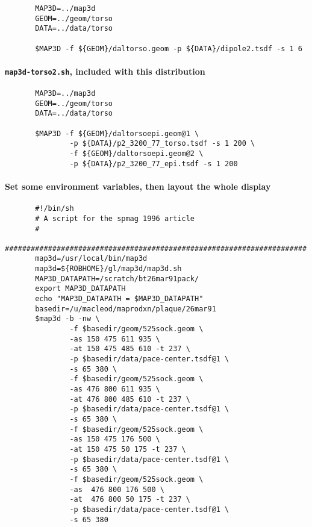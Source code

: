 \begin{verbatim}
       MAP3D=../map3d
       GEOM=../geom/torso
       DATA=../data/torso

       $MAP3D -f ${GEOM}/daltorso.geom -p ${DATA}/dipole2.tsdf -s 1 6
\end{verbatim}

\paragraph{\texttt{map3d-torso2.sh}, included with this distribution}

\begin{verbatim}
       MAP3D=../map3d
       GEOM=../geom/torso
       DATA=../data/torso

       $MAP3D -f ${GEOM}/daltorsoepi.geom@1 \
               -p ${DATA}/p2_3200_77_torso.tsdf -s 1 200 \
               -f ${GEOM}/daltorsoepi.geom@2 \
               -p ${DATA}/p2_3200_77_epi.tsdf -s 1 200

\end{verbatim}


\paragraph{Set some environment variables, then layout the whole display}

\begin{verbatim}
       #!/bin/sh
       # A script for the spmag 1996 article
       #
       ######################################################################
       map3d=/usr/local/bin/map3d
       map3d=${ROBHOME}/gl/map3d/map3d.sh
       MAP3D_DATAPATH=/scratch/bt26mar91pack/
       export MAP3D_DATAPATH
       echo "MAP3D_DATAPATH = $MAP3D_DATAPATH"
       basedir=/u/macleod/maprodxn/plaque/26mar91
       $map3d -b -nw \
               -f $basedir/geom/525sock.geom \
               -as 150 475 611 935 \
               -at 150 475 485 610 -t 237 \
               -p $basedir/data/pace-center.tsdf@1 \
               -s 65 380 \
               -f $basedir/geom/525sock.geom \
               -as 476 800 611 935 \
               -at 476 800 485 610 -t 237 \
               -p $basedir/data/pace-center.tsdf@1 \
               -s 65 380 \
               -f $basedir/geom/525sock.geom \
               -as 150 475 176 500 \
               -at 150 475 50 175 -t 237 \
               -p $basedir/data/pace-center.tsdf@1 \
               -s 65 380 \
               -f $basedir/geom/525sock.geom \
               -as  476 800 176 500 \
               -at  476 800 50 175 -t 237 \
               -p $basedir/data/pace-center.tsdf@1 \
               -s 65 380 
\end{verbatim}



